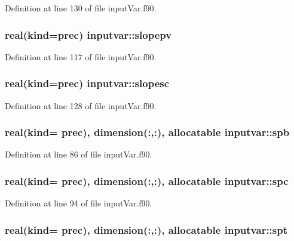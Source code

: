 Definition at line 130 of file input\-Var.\-f90.

\hypertarget{classinputvar_a14912f73e74d3dedf580804ab63fd57f}{
\subsubsection[{slopepv}]{\setlength{\rightskip}{0pt plus 5cm}real(kind=prec) inputvar\-::slopepv}}\label{classinputvar_a14912f73e74d3dedf580804ab63fd57f}


Definition at line 117 of file input\-Var.\-f90.

\hypertarget{classinputvar_a38a21450f63b87e2e09c5c4eedd3e6ef}{
\subsubsection[{slopesc}]{\setlength{\rightskip}{0pt plus 5cm}real(kind=prec) inputvar\-::slopesc}}\label{classinputvar_a38a21450f63b87e2e09c5c4eedd3e6ef}


Definition at line 128 of file input\-Var.\-f90.

\hypertarget{classinputvar_acd5ae0efcfc5e54e9c73d085132bcf5a}{
\subsubsection[{spb}]{\setlength{\rightskip}{0pt plus 5cm}real(kind= prec), dimension(\-:,\-:), allocatable inputvar\-::spb}}\label{classinputvar_acd5ae0efcfc5e54e9c73d085132bcf5a}


Definition at line 86 of file input\-Var.\-f90.

\hypertarget{classinputvar_a7a6b03a57941065017f0fe71a9d641f1}{
\subsubsection[{spc}]{\setlength{\rightskip}{0pt plus 5cm}real(kind= prec), dimension(\-:,\-:), allocatable inputvar\-::spc}}\label{classinputvar_a7a6b03a57941065017f0fe71a9d641f1}


Definition at line 94 of file input\-Var.\-f90.

\hypertarget{classinputvar_aa1da1474767137ee483ef4253b7cef85}{
\subsubsection[{spt}]{\setlength{\rightskip}{0pt plus 5cm}real(kind= prec), dimension(\-:,\-:), allocatable inputvar\-::spt}}\label{classinputvar_aa1da1474767137ee483ef4253b7cef85}


